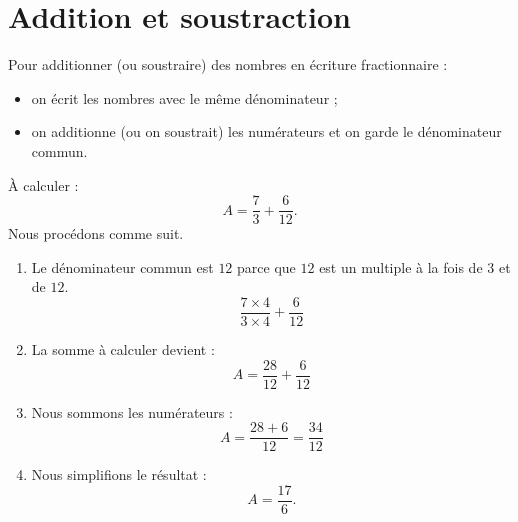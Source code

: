 


\section{Addition et soustraction}

\begin{Aretenir}
    Pour additionner (ou soustraire) des nombres en écriture fractionnaire :
    \begin{itemize}
        \item 
            on écrit les nombres avec le même dénominateur ;
        \item 
            on additionne (ou on soustrait) les numérateurs et on garde le dénominateur commun.
    \end{itemize}
\end{Aretenir}

\begin{example}
    À calculer : 
    \begin{equation}
        A=\frac{ 7 }{ 3 }+\frac{ 6 }{ 12 }.
    \end{equation}
    Nous procédons comme suit.
    \begin{enumerate}
        \item
            Le dénominateur commun est \( 12\) parce que \( 12\) est un multiple à la fois de \( 3\) et de \( 12\).
            \begin{equation}
                \frac{ 7\times 4 }{ 3\times 4 }+\frac{ 6 }{ 12 }
            \end{equation}
        \item
            La somme à calculer devient :
            \begin{equation}
                A=\frac{ 28 }{ 12 }+\frac{ 6 }{ 12 }
            \end{equation}
        \item
            Nous sommons les numérateurs :
            \begin{equation}
                A=\frac{ 28+6 }{ 12 }=\frac{ 34 }{ 12 }
            \end{equation}
        \item
            Nous simplifions le résultat :
            \begin{equation}
                A=\frac{ 17 }{ 6 }.
            \end{equation}
    \end{enumerate}
\end{example}

